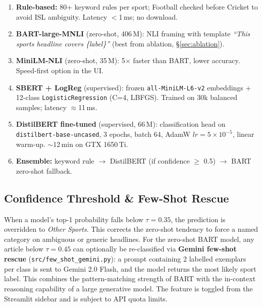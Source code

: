 \documentclass[11pt,a4paper]{article}
\begin{document}
\begin{enumerate}[noitemsep,leftmargin=*]

\item \textbf{Rule-based:} 80+ keyword rules per sport; Football checked before Cricket to avoid ISL ambiguity. Latency $<$1\,ms; no download.

\item \textbf{BART-large-MNLI} \cite{lewis2020bart} (zero-shot, 406\,M): NLI framing with template \emph{``This sports headline covers \{label\}''} (best from ablation, \S\ref{sec:ablation}).

\item \textbf{MiniLM-NLI} (zero-shot, 35\,M): 5$\times$ faster than BART, lower accuracy. Speed-first option in the UI.

\item \textbf{SBERT + LogReg} (supervised): frozen \texttt{all-MiniLM-L6-v2} embeddings + 12-class \texttt{LogisticRegression} (C=4, LBFGS). Trained on 30k balanced samples; latency $\approx$11\,ms.

\item \textbf{DistilBERT fine-tuned} \cite{sanh2019distilbert} (supervised, 66\,M): classification head on \texttt{distilbert-base-uncased}, 3 epochs, batch 64, AdamW $lr=5\!\times\!10^{-5}$, linear warm-up. $\sim$12\,min on GTX 1650\,Ti.

\item \textbf{Ensemble:} keyword rule $\to$ DistilBERT (if confidence $\ge$ 0.5) $\to$ BART zero-shot fallback.

\end{enumerate}

\subsection{Confidence Threshold \& Few-Shot Rescue}

When a model's top-1 probability falls below $\tau=0.35$, the prediction is overridden to \textit{Other Sports}. This corrects the zero-shot tendency to force a named category on ambiguous or generic headlines. For the zero-shot BART model, any article below $\tau=0.45$ can optionally be re-classified via \textbf{Gemini few-shot rescue} (\texttt{src/few\_shot\_gemini.py}): a prompt containing 2 labelled exemplars per class is sent to Gemini 2.0 Flash, and the model returns the most likely sport label. This combines the pattern-matching strength of BART with the in-context reasoning capability of a large generative model. The feature is toggled from the Streamlit sidebar and is subject to API quota limits.
\end{document}
